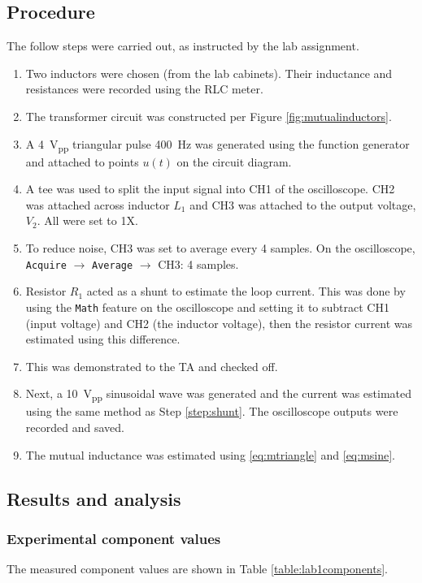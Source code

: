\documentclass{report}
\newcommand{\pp}{_{pp}}
\newcommand{\Vpp}{\V\pp}
\begin{document}
\pagebreak
\subsection{Procedure}
The follow steps were carried out, as instructed by the lab assignment.
\begin{enumerate}
	\item Two inductors were chosen (from the lab cabinets). Their inductance and resistances were recorded using the RLC meter.
	\item The transformer circuit was constructed per Figure \ref{fig:mutualinductors}.
	\item A \SI{4}{\Vpp} triangular pulse \SI{400}{\Hz} was generated using the function generator and attached to points $u(t)$ on the circuit diagram.
	\item A tee was used to split the input signal into CH1 of the oscilloscope. CH2 was attached across inductor $L_1$ and CH3 was attached to the output voltage, $V_2$. All were set to 1X.
	\item To reduce noise, CH3 was set to average every 4 samples. On the oscilloscope, \texttt{Acquire} $\rightarrow$ \texttt{Average} $\rightarrow$ CH3: 4 samples.
	\item Resistor $R_1$ acted as a shunt to estimate the loop current. This was done by using the \texttt{Math} feature on the oscilloscope and setting it to subtract CH1 (input voltage) and CH2 (the inductor voltage), then the resistor current was estimated using this difference. \label{step:shunt}
	\item This was demonstrated to the TA and checked off.
	\item Next, a \SI{10}{\Vpp} sinusoidal wave was generated and the current was estimated using the same method as Step \ref{step:shunt}. The oscilloscope outputs were recorded and saved.
	\item The mutual inductance was estimated using \eqref{eq:mtriangle} and \eqref{eq:msine}.
\end{enumerate}

\subsection{Results and analysis}

\subsubsection{Experimental component values}
The measured component values are shown in Table \ref{table:lab1components}.
\end{document}
